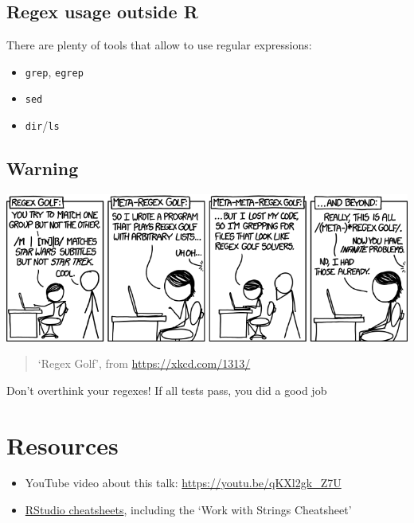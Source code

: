 \documentclass[]{book}
\providecommand{\tightlist}{%
  \setlength{\itemsep}{0pt}\setlength{\parskip}{0pt}}
\begin{document}
\hypertarget{regex-usage-outside-r}{%
\subsection{Regex usage outside R}\label{regex-usage-outside-r}}

There are plenty of tools that allow to use regular expressions:

\begin{itemize}
\tightlist
\item
  \texttt{grep}, \texttt{egrep}
\item
  \texttt{sed}
\item
  \texttt{dir}/\texttt{ls}
\end{itemize}

\hypertarget{warning}{%
\subsection{Warning}\label{warning}}

\includegraphics{data/06_regex_golf.png}

\begin{quote}
`Regex Golf', from \url{https://xkcd.com/1313/}
\end{quote}

Don't overthink your regexes! If all tests pass, you did a good job

\hypertarget{resources}{%
\section{Resources}\label{resources}}

\begin{itemize}
\tightlist
\item
  YouTube video about this talk: \url{https://youtu.be/qKXl2gk_Z7U}
\item
  \href{https://rstudio.com/resources/cheatsheets/}{RStudio cheatsheets},
  including the `Work with Strings Cheatsheet'
\end{itemize}
\end{document}

